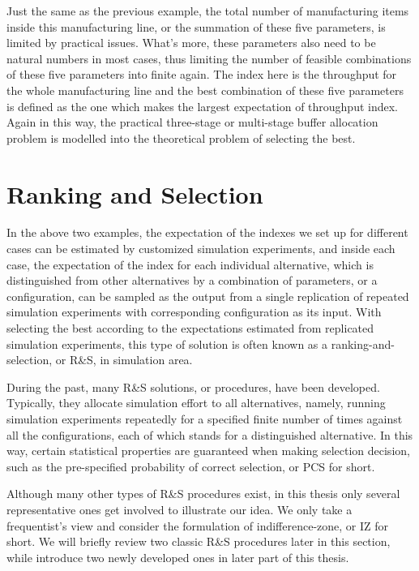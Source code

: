 \documentclass[12pt,a4]{report}
\begin{document}
Just the same as the previous example, the total number of manufacturing items inside this manufacturing line, or the summation of these five parameters, is limited by practical issues. What's more, these parameters also need to be natural numbers in most cases, thus limiting the number of feasible combinations of these five parameters into finite again. The index here is the throughput for the whole manufacturing line and the best combination of these five parameters is defined as the one which makes the largest expectation of throughput index. Again in this way, the practical three-stage or multi-stage buffer allocation problem is modelled into the theoretical problem of selecting the best.

\section{Ranking and Selection}

In the above two examples, the expectation of the indexes we set up for different cases can be estimated by customized simulation experiments, and inside each case, the expectation of the index for each individual alternative, which is distinguished from other alternatives by a combination of parameters, or a configuration, can be sampled as the output from a single replication of repeated simulation experiments with corresponding configuration as its input. With selecting the best according to the expectations estimated from replicated simulation experiments, this type of solution is often known as a ranking-and-selection, or R\&S, in simulation area.

During the past, many R\&S solutions, or procedures, have been developed. Typically, they allocate simulation effort to all alternatives, namely, running simulation experiments repeatedly for a specified finite number of times against all the configurations, each of which stands for a distinguished alternative. In this way, certain statistical properties are guaranteed when making selection decision, such as the pre-specified probability of correct selection, or PCS for short.

Although many other types of R\&S procedures exist, in this thesis only several representative ones get involved to illustrate our idea. We only take a frequentist’s view and consider the formulation of indifference-zone, or IZ for short. We will briefly review two classic R\&S procedures later in this section, while introduce two newly developed ones in later part of this thesis.
\end{document}
